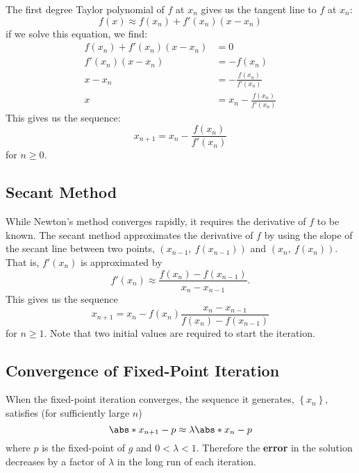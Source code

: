 \documentclass{article}
\begin{document}
The first degree Taylor polynomial of \(f\) at \(x_n\) gives us the tangent line to \(f\) at \(x_n\):
\begin{equation*}
    f\left( x \right) \approx f\left( x_n \right) + f'\left( x_n \right) \left( x - x_n \right)
\end{equation*}
if we solve this equation, we find:
\begin{align*}
    f\left( x_n \right) + f'\left( x_n \right) \left( x - x_n \right) & = 0 \\
    f'\left( x_n \right) \left( x - x_n \right) & = -f\left( x_n \right) \\
    x - x_n & = -\frac{f\left( x_n \right)}{f'\left( x_n \right)} \\
    x & = x_n - \frac{f\left( x_n \right)}{f'\left( x_n \right)}
\end{align*}
This gives us the sequence:
\begin{equation*}
    x_{n + 1} = x_n - \frac{f\left( x_n \right)}{f'\left( x_n \right)}
\end{equation*}
for \(n \geq 0\).
\subsection{Secant Method}
While Newton's method converges rapidly, it requires the derivative of \(f\) to be known. The secant
method approximates the derivative of \(f\) by using the slope of the secant line between two points,
\(\left( x_{n - 1},\: f\left( x_{n - 1} \right)\right)\) and \(\left( x_n,\: f\left( x_n \right) \right)\).
That is, \(f'\left( x_n \right)\) is approximated by
\begin{equation*}
    f'\left( x_n \right) \approx \frac{f\left( x_n \right) - f\left( x_{n - 1} \right)}{x_n - x_{n - 1}}.
\end{equation*}
This gives us the sequence
\begin{equation*}
    x_{n + 1} = x_n - f\left( x_n \right) \frac{x_n - x_{n - 1}}{f\left( x_n \right) - f\left( x_{n - 1} \right)}
\end{equation*}
for \(n \geq 1\). Note that two initial values are required to start the iteration.
\subsection{Convergence of Fixed-Point Iteration}
When the fixed-point iteration converges, the sequence it generates, \(\left\{ x_n \right\}\), satisfies (for sufficiently large \(n\))
\begin{equation*}
    \abs*{x_{n + 1} - p} \approx \lambda \abs*{x_n - p}
\end{equation*}
where \(p\) is the fixed-point of \(g\) and \(0 < \lambda < 1\). Therefore the \textbf{error} in the solution decreases
by a factor of \(\lambda\) in the long run of each iteration.
\end{document}
